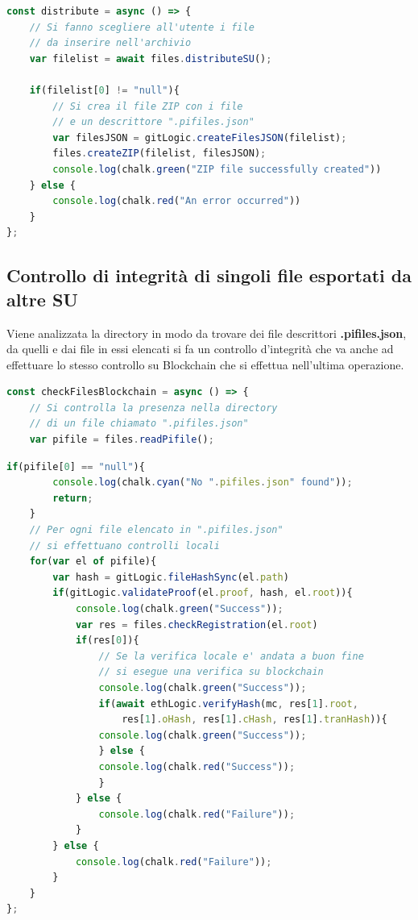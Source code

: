 \begin{lstlisting}[language=JavaScript]
const distribute = async () => {
    // Si fanno scegliere all'utente i file
    // da inserire nell'archivio
    var filelist = await files.distributeSU();
    
    if(filelist[0] != "null"){
        // Si crea il file ZIP con i file
        // e un descrittore ".pifiles.json"
        var filesJSON = gitLogic.createFilesJSON(filelist);
        files.createZIP(filelist, filesJSON);
        console.log(chalk.green("ZIP file successfully created"))
    } else {
        console.log(chalk.red("An error occurred"))
    }
};
\end{lstlisting}

\subsection{Controllo di integrità di singoli file esportati da altre SU}
Viene analizzata la directory in modo da trovare dei file descrittori \textbf{.pifiles.json}, da quelli e dai file in essi elencati si fa un controllo d'integrità che va anche ad effettuare lo stesso controllo su Blockchain che si effettua nell'ultima operazione.

\begin{lstlisting}[language=JavaScript]
const checkFilesBlockchain = async () => {
    // Si controlla la presenza nella directory
    // di un file chiamato ".pifiles.json"
    var pifile = files.readPifile();
\end{lstlisting}
\newpage
\begin{lstlisting}[language=JavaScript, firstnumber=5]
    if(pifile[0] == "null"){
        console.log(chalk.cyan("No ".pifiles.json" found"));
        return;
    }
    // Per ogni file elencato in ".pifiles.json"
    // si effettuano controlli locali
    for(var el of pifile){
        var hash = gitLogic.fileHashSync(el.path)
        if(gitLogic.validateProof(el.proof, hash, el.root)){
            console.log(chalk.green("Success"));
            var res = files.checkRegistration(el.root)
            if(res[0]){
                // Se la verifica locale e' andata a buon fine
                // si esegue una verifica su blockchain
                console.log(chalk.green("Success"));
                if(await ethLogic.verifyHash(mc, res[1].root,
                    res[1].oHash, res[1].cHash, res[1].tranHash)){
                console.log(chalk.green("Success"));
                } else {
                console.log(chalk.red("Success"));
                }
            } else {
                console.log(chalk.red("Failure"));
            }
        } else {
            console.log(chalk.red("Failure"));
        }
    }
};
\end{lstlisting}

